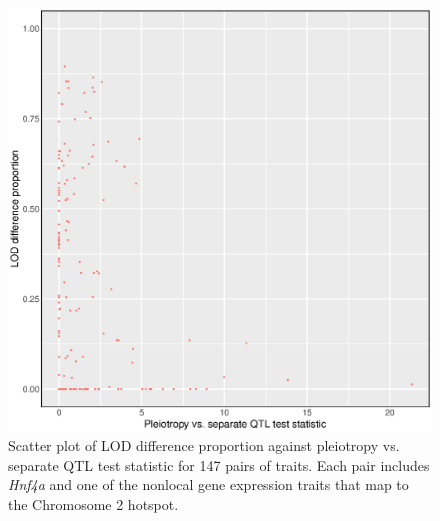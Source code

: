 \documentclass{article}
\begin{document}
\begin{figure}
    \centering
    \includegraphics[width = \textwidth]{../Rmd/Hnf4a-lod-diff-prop-v-lrt.eps}
    \caption{Scatter plot of LOD difference proportion against pleiotropy vs. separate QTL test statistic for 147 pairs of traits. Each pair includes \emph{Hnf4a} and one of the nonlocal gene expression traits that map to the Chromosome 2 hotspot.}
    \label{fig:hnf4a}
\end{figure}
\end{document}
